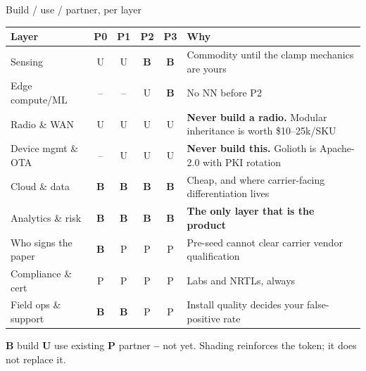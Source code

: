 \documentclass[aspectratio=169,t,10pt,xcolor={table,svgnames}]{beamer}
\newcommand{\hd}[1]{\textbf{\footnotesize #1}}
\newcommand{\tB}{\cellcolor{fill3}\textbf{B}}
\newcommand{\tU}{\cellcolor{fill1}U}
\newcommand{\tP}{\cellcolor{fill2}P}
\newcommand{\tN}{\cellcolor{fill0}\textcolor{inkmute}{--}}
\begin{document}
\begin{frame}{Build / use / partner, per layer}
  \scriptsize
  \begin{tabular}{@{}p{}cccc p{}@{}}
    \toprule
    \hd{Layer} & \hd{P0} & \hd{P1} & \hd{P2} & \hd{P3} & \hd{Why} \\
    \midrule
    Sensing              & \tU & \tU & \tB & \tB & Commodity until the clamp mechanics are yours \\
    Edge compute/ML      & \tN & \tN & \tU & \tB & No NN before P2 \\
    Radio \& WAN         & \tU & \tU & \tU & \tU & \textbf{Never build a radio.} Modular inheritance is worth \$10--25k/SKU \\
    Device mgmt \& OTA   & \tN & \tU & \tU & \tU & \textbf{Never build this.} Golioth is Apache-2.0 with PKI rotation \\
    Cloud \& data        & \tB & \tB & \tB & \tB & Cheap, and where carrier-facing differentiation lives \\
    Analytics \& risk    & \tB & \tB & \tB & \tB & \textbf{The only layer that is the product} \\
    Who signs the paper  & \tB & \tP & \tP & \tP & Pre-seed cannot clear carrier vendor qualification \\
    Compliance \& cert   & \tP & \tP & \tP & \tP & Labs and NRTLs, always \\
    Field ops \& support & \tB & \tB & \tP & \tP & Install quality decides your false-positive rate \\
    \bottomrule
  \end{tabular}
  \vspace{0.5em}
  {\scriptsize\color{inkmute}\textbf{B} build \textperiodcentered{} \textbf{U} use existing
   \textperiodcentered{} \textbf{P} partner \textperiodcentered{} \textbf{--} not yet.
   Shading reinforces the token; it does not replace it.\par}
\end{frame}
\end{document}
